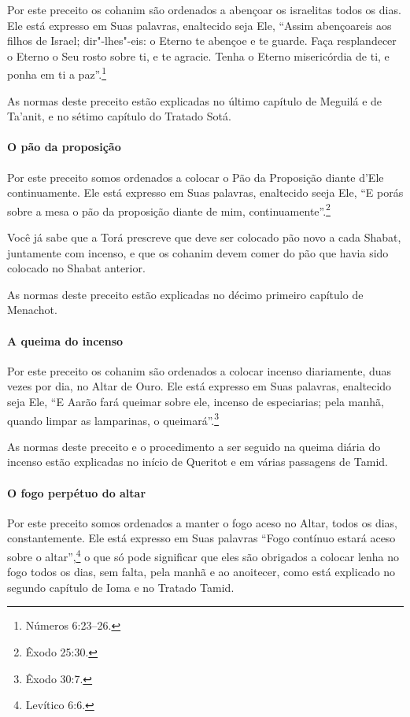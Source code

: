 \begin{multicols}{2}
Por este preceito os cohanim\starr{} são ordenados a abençoar os israelitas
todos os dias. Ele está expresso em Suas palavras, enaltecido seja Ele,
``Assim abençoareis aos filhos de Israel; dir"-lhes"-eis: o Eterno te
abençoe e te guarde. Faça resplandecer o Eterno o Seu rosto sobre ti, e
te agracie. Tenha o Eterno misericórdia de ti, e ponha em ti a paz''.\footnote{Números 6:23--26.}

As normas deste preceito estão explicadas no último capítulo de Meguilá\starr{}
e de Ta'anit\starr, e no sétimo capítulo do Tratado Sotá\starr.

\paragraph{O pão da proposição}

Por este preceito somos ordenados a colocar o Pão da Proposição diante
d'Ele continuamente. Ele está expresso em Suas palavras, enaltecido
seeja Ele, ``E porás sobre a mesa o pão da proposição diante de mim,
continuamente''.\footnote{Êxodo 25:30.}

Você já sabe que a Torá\starr{} prescreve que deve ser colocado pão novo a cada Shabat, juntamente com incenso, e que os cohanim\starr{} devem
comer do pão que havia sido colocado no Shabat anterior.

As normas deste preceito estão explicadas no décimo primeiro capítulo
de Menachot\starr.

\paragraph{A queima do incenso}

Por este preceito os cohanim\starr{} são ordenados a colocar incenso
diariamente, duas vezes por dia, no Altar de Ouro. Ele está expresso em
Suas palavras, enaltecido seja Ele, ``E Aarão fará queimar sobre ele,
incenso de especiarias; pela manhã, quando limpar as lamparinas, o
queimará''.\footnote{Êxodo 30:7.}

As normas deste preceito e o procedimento a ser seguido na queima diária
do incenso estão explicadas no início de Queritot\starr{} e em várias passagens
de Tamid\starr.

\paragraph{O fogo perpétuo do altar}

Por este preceito somos ordenados a manter o fogo aceso no Altar, todos
os dias, constantemente. Ele está expresso em Suas palavras ``Fogo
contínuo estará aceso sobre o altar'',\footnote{Levítico 6:6.} o que só pode
significar que eles são obrigados a colocar lenha no fogo todos os dias,
sem falta, pela manhã e ao anoitecer, como está explicado no segundo
capítulo de Ioma\starr{} e no Tratado Tamid\starr.


\end{multicols}
